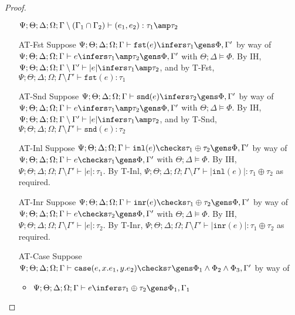\begin{proof}
\begin{enumerate}
$\Psi ; \Theta ; \Delta ; \Omega ; \Gamma \setminus (\Gamma_1 \cap \Gamma_2)\vdash (e_1,e_2) : \tau_1 \amp \tau_2$
  \item[AT-Fst] Suppose $\Psi ; \Theta ; \Delta ; \Omega ; \Gamma \vdash \texttt{fst}(e) \infers \tau_1 \gens \Phi,\Gamma'$ by way of $\Psi ; \Theta ; \Delta ; \Omega ; \Gamma \vdash e \infers \tau_1 \amp \tau_2 \gens \Phi,\Gamma'$ with $\Theta ; \Delta \vDash \Phi$. By IH, $\Psi ; \Theta ; \Delta ; \Omega ; \Gamma \setminus \Gamma' \vdash |e| \infers \tau_1 \amp \tau_2$, and by T-Fst, $\Psi ; \Theta ; \Delta ; \Omega ; \Gamma \setminus \Gamma' \vdash \texttt{fst}(e) : \tau_1$
  \item[AT-Snd] Suppose $\Psi ; \Theta ; \Delta ; \Omega ; \Gamma \vdash \texttt{snd}(e) \infers \tau_2 \gens \Phi,\Gamma'$ by way of $\Psi ; \Theta ; \Delta ; \Omega ; \Gamma \vdash e \infers \tau_1 \amp \tau_2 \gens \Phi,\Gamma'$ with $\Theta ; \Delta \vDash \Phi$. By IH, $\Psi ; \Theta ; \Delta ; \Omega ; \Gamma \setminus \Gamma' \vdash |e| \infers \tau_1 \amp \tau_2$, and by T-Snd, $\Psi ; \Theta ; \Delta ; \Omega ; \Gamma \setminus \Gamma' \vdash \texttt{snd}(e) : \tau_2$
  \item[AT-Inl] Suppose $\Psi ; \Theta ; \Delta ; \Omega ; \Gamma \vdash \texttt{inl}(e) \checks \tau_1 \oplus \tau_2 \gens \Phi,\Gamma'$ by way of $\Psi ; \Theta ; \Delta ; \Omega ; \Gamma \vdash e \checks \tau_1 \gens \Phi,\Gamma'$ with $\Theta ; \Delta \vDash \Phi$. By IH, $\Psi ; \Theta ; \Delta ; \Omega ; \Gamma \setminus \Gamma' \vdash |e| : \tau_1$. By T-Inl,  $\Psi ; \Theta ; \Delta ; \Omega ; \Gamma \setminus \Gamma' \vdash |\texttt{inl}(e)| : \tau_1 \oplus \tau_2$ as required.
  \item[AT-Inr] Suppose $\Psi ; \Theta ; \Delta ; \Omega ; \Gamma \vdash \texttt{inr}(e) \checks \tau_1 \oplus \tau_2 \gens \Phi,\Gamma'$ by way of $\Psi ; \Theta ; \Delta ; \Omega ; \Gamma \vdash e \checks \tau_2 \gens \Phi,\Gamma'$ with $\Theta ; \Delta \vDash \Phi$. By IH, $\Psi ; \Theta ; \Delta ; \Omega ; \Gamma \setminus \Gamma' \vdash |e| : \tau_2$. By T-Inr,  $\Psi ; \Theta ; \Delta ; \Omega ; \Gamma \setminus \Gamma' \vdash |\texttt{inr}(e)| : \tau_1 \oplus \tau_2$ as required.
  \item[AT-Case] Suppose $\Psi ; \Theta ; \Delta ; \Omega ; \Gamma \vdash \texttt{case}(e,x.e_1,y.e_2) \checks \tau \gens \Phi_1 \wedge \Phi_2 \wedge \Phi_3, \Gamma'$ by way of
  \begin{itemize}
    \item $\Psi ; \Theta ; \Delta ; \Omega ; \Gamma \vdash e \infers \tau_1 \oplus \tau_2 \gens \Phi_1, \Gamma_1$

\end{itemize}
\end{enumerate}
\end{proof}
